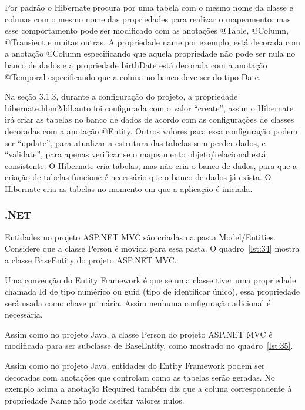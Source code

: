 \documentclass[a4paper,12pt]{article}
\newcommand{\javacode}[3] {
	
	\FloatBarrier
}
\begin{document}
Por padrão o Hibernate procura por uma tabela com o mesmo nome da classe e colunas com o mesmo nome das propriedades para realizar o mapeamento, mas esse comportamento pode ser modificado com as anotações @Table, @Column, @Transient e muitas outras. A propriedade name por exemplo, está decorada com a anotação @Column especificando que aquela propriedade não pode ser nula no banco de dados e a propriedade birthDate está decorada com a anotação @Temporal especificando que a coluna no banco deve ser do tipo Date.

Na seção 3.1.3, durante a configuração do projeto, a propriedade hibernate.hbm2ddl.auto foi configurada com o valor “create”, assim o Hibernate irá criar as tabelas no banco de dados de acordo com as configurações de classes decoradas com a anotação @Entity. Outros valores para essa configuração podem ser “update”, para atualizar a estrutura das tabelas sem perder dados, e “validate”, para apenas verificar se o mapeamento objeto/relacional está consistente. O Hibernate cria tabelas, mas não cria o banco de dados, para que a criação de tabelas funcione é necessário que o banco de dados já exista. O Hibernate cria as tabelas no momento em que a aplicação é iniciada.

\subsubsection{.NET}

Entidades no projeto ASP.NET MVC são criadas na pasta Model/Entities. Considere que a classe Person é movida para essa pasta. O quadro~\ref{lst:34} mostra a classe BaseEntity do projeto ASP.NET MVC.

\javacode{code/34.txt}{Classe BaseEntity no projeto ASP.NET}{lst:34}

Uma convenção do Entity Framework é que se uma classe tiver uma propriedade chamada Id de tipo numérico ou guid (tipo de identificar único), essa propriedade será usada como chave primária. Assim nenhuma configuração adicional é necessária.

Assim como no projeto Java, a classe Person do projeto ASP.NET MVC é modificada para ser subclasse de BaseEntity, como mostrado no quadro~\ref{lst:35}.

\javacode{code/35.txt}{Classe Person no projeto ASP.NET agora herda de BaseEntity}{lst:35}

Assim como no projeto Java, entidades do Entity Framework podem ser decoradas com anotações que controlam como as tabelas serão geradas. No exemplo acima a anotação Required também diz que a coluna correspondente à propriedade Name não pode aceitar valores nulos.
\end{document}
